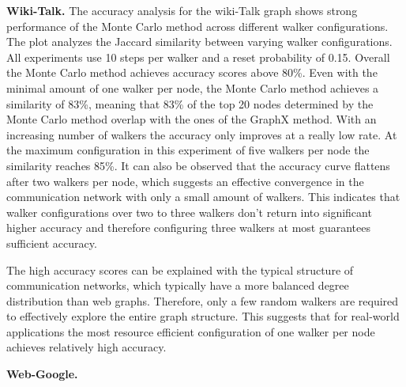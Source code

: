 \textbf{Wiki-Talk.} The accuracy analysis for the wiki-Talk graph shows strong performance of the Monte Carlo method across different walker configurations. The plot analyzes the Jaccard similarity between varying walker configurations. All experiments use 10 steps per walker and a reset probability of 0.15. Overall the Monte Carlo method achieves accuracy scores above 80\%. Even with the minimal amount of one walker per node, the Monte Carlo method achieves a similarity of 83\%, meaning that 83\% of the top 20 nodes determined by the Monte Carlo method overlap with the ones of the GraphX method. With an increasing number of walkers the accuracy only improves at a really low rate. At the maximum configuration in this experiment of five walkers per node the similarity reaches 85\%. It can also be observed that the accuracy curve flattens after two walkers per node, which suggests an effective convergence in the communication network with only a small amount of walkers. This indicates that walker configurations over two to three walkers don't return into significant higher accuracy and therefore configuring three walkers at most guarantees sufficient accuracy.\par
The high accuracy scores can be explained with the typical structure of communication networks, which typically have a more balanced degree distribution than web graphs. Therefore, only a few random walkers are required to effectively explore the entire graph structure. This suggests that for real-world applications the most resource efficient configuration of one walker per node achieves relatively high accuracy.\par
\textbf{Web-Google.}

